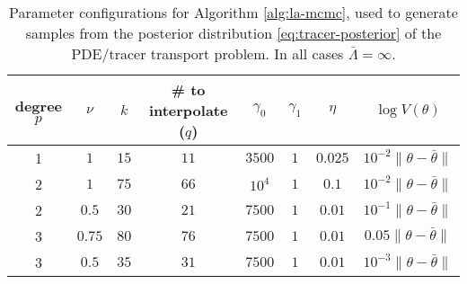 
\begin{table}[h!]
    \centering
    \begin{tabular}{c|c|c|c|c|c|c|c}
        degree $p$ & $\nu$ & $k$ & \# to interpolate ($q$) & $\gamma_0$ & $\gamma_1$ & $\eta$ & $\log{V(\theta)}$ \\ \hline \hline
        1 & $1$ & $15$ & $11$ & $3500$ & $1$ & $0.025$ & $10^{-2} \|\theta-\bar{\theta}\|$ \\
        2 & $1$ & $75$ & $66$ & $10^{4}$ & $1$ & $0.1$ & $10^{-2} \|\theta-\bar{\theta}\|$ \\
        2 & $0.5$ & $30$ & $21$ & $7500$ & $1$ & $0.01$ & $10^{-1} \|\theta-\bar{\theta}\|$ \\
        3 & $0.75$ & $80$ & $76$ & $7500$ & $1$ & $0.01$ & $0.05 \|\theta-\bar{\theta}\|$ \\
        3 & $0.5$ & $35$ & $31$ & $7500$ & $1$ & $0.01$ & $10^{-3} \|\theta-\bar{\theta}\|$ 
    \end{tabular}
    \caption{Parameter configurations for Algorithm \ref{alg:la-mcmc}, used to generate samples from the posterior distribution \eqref{eq:tracer-posterior} of the PDE/tracer transport problem. In all cases $\bar{\Lambda} = \infty$.}
    \label{tab:tracer-mcmc-parameters}
\end{table}

